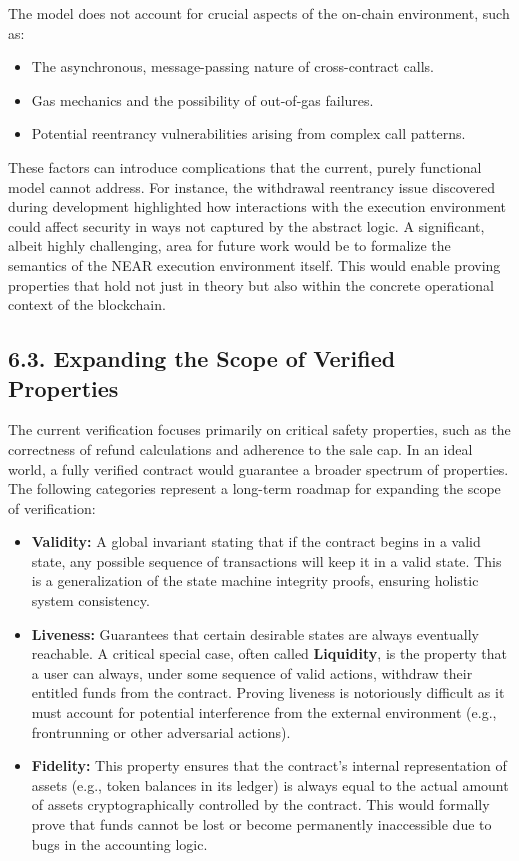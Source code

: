 \documentclass[
  english,
  onecolumn]{article}
\providecommand{\tightlist}{%
  \setlength{\itemsep}{0pt}\setlength{\parskip}{0pt}}
\begin{document}
The model does not account for crucial aspects of the on-chain
environment, such as:

\begin{itemize}
\tightlist
\item
  The asynchronous, message-passing nature of cross-contract calls.
\item
  Gas mechanics and the possibility of out-of-gas failures.
\item
  Potential reentrancy vulnerabilities \citep{weir2018formal} arising
  from complex call patterns.
\end{itemize}

These factors can introduce complications that the current, purely
functional model cannot address. For instance, the withdrawal reentrancy
issue discovered during development highlighted how interactions with
the execution environment could affect security in ways not captured by
the abstract logic. A significant, albeit highly challenging, area for
future work would be to formalize the semantics of the NEAR execution
environment itself. This would enable proving properties that hold not
just in theory but also within the concrete operational context of the
blockchain.

\subsection{6.3. Expanding the Scope of Verified
Properties}\label{expanding-the-scope-of-verified-properties}

The current verification focuses primarily on critical safety
properties, such as the correctness of refund calculations and adherence
to the sale cap. In an ideal world, a fully verified contract would
guarantee a broader spectrum of properties. The following categories
represent a long-term roadmap for expanding the scope of verification:

\begin{itemize}
\tightlist
\item
  \textbf{Validity:} A global invariant stating that if the contract
  begins in a valid state, any possible sequence of transactions will
  keep it in a valid state. This is a generalization of the state
  machine integrity proofs, ensuring holistic system consistency.
\item
  \textbf{Liveness:} Guarantees that certain desirable states are always
  eventually reachable. A critical special case, often called
  \textbf{Liquidity}, is the property that a user can always, under some
  sequence of valid actions, withdraw their entitled funds from the
  contract. Proving liveness is notoriously difficult as it must account
  for potential interference from the external environment (e.g.,
  frontrunning or other adversarial actions).
\item
  \textbf{Fidelity:} This property ensures that the contract's internal
  representation of assets (e.g., token balances in its ledger) is
  always equal to the actual amount of assets cryptographically
  controlled by the contract. This would formally prove that funds
  cannot be lost or become permanently inaccessible due to bugs in the
  accounting logic.
\end{itemize}
\end{document}
